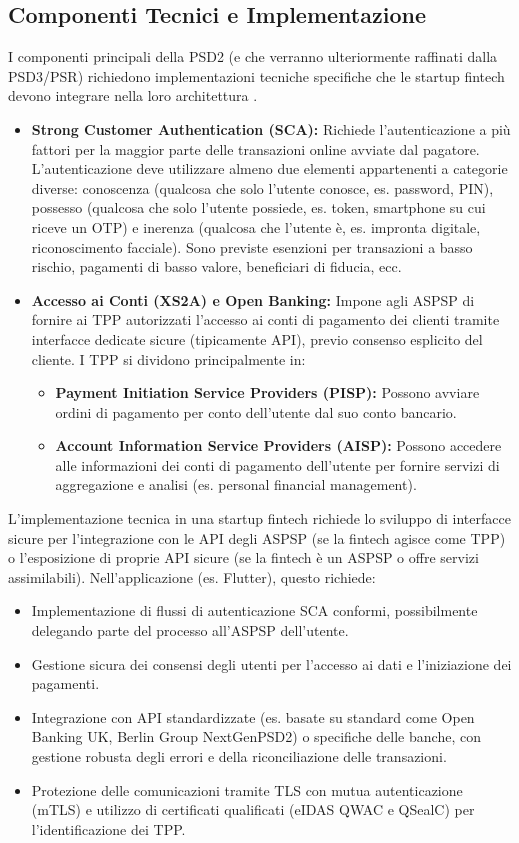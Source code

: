 \subsection{Componenti Tecnici e Implementazione}
I componenti principali della PSD2 (e che verranno ulteriormente raffinati dalla PSD3/PSR) richiedono implementazioni tecniche specifiche che le startup fintech devono integrare nella loro architettura .
\begin{itemize}
    \item \textbf{Strong Customer Authentication (SCA):} Richiede l'autenticazione a più fattori per la maggior parte delle transazioni online avviate dal pagatore. L'autenticazione deve utilizzare almeno due elementi appartenenti a categorie diverse: conoscenza (qualcosa che solo l'utente conosce, es. password, PIN), possesso (qualcosa che solo l'utente possiede, es. token, smartphone su cui riceve un OTP) e inerenza (qualcosa che l'utente è, es. impronta digitale, riconoscimento facciale). Sono previste esenzioni per transazioni a basso rischio, pagamenti di basso valore, beneficiari di fiducia, ecc.
    \item \textbf{Accesso ai Conti (XS2A) e Open Banking:} Impone agli ASPSP di fornire ai TPP autorizzati l'accesso ai conti di pagamento dei clienti tramite interfacce dedicate sicure (tipicamente API), previo consenso esplicito del cliente. I TPP si dividono principalmente in:
    \begin{itemize}
        \item \textbf{Payment Initiation Service Providers (PISP):} Possono avviare ordini di pagamento per conto dell'utente dal suo conto bancario.
        \item \textbf{Account Information Service Providers (AISP):} Possono accedere alle informazioni dei conti di pagamento dell'utente per fornire servizi di aggregazione e analisi (es. personal financial management).
    \end{itemize}
\end{itemize}
L'implementazione tecnica in una startup fintech richiede lo sviluppo di interfacce sicure per l'integrazione con le API degli ASPSP (se la fintech agisce come TPP) o l'esposizione di proprie API sicure (se la fintech è un ASPSP o offre servizi assimilabili). Nell'applicazione (es. Flutter), questo richiede:
\begin{itemize}
    \item Implementazione di flussi di autenticazione SCA conformi, possibilmente delegando parte del processo all'ASPSP dell'utente.
    \item Gestione sicura dei consensi degli utenti per l'accesso ai dati e l'iniziazione dei pagamenti.
    \item Integrazione con API standardizzate (es. basate su standard come Open Banking UK, Berlin Group NextGenPSD2) o specifiche delle banche, con gestione robusta degli errori e della riconciliazione delle transazioni.
    \item Protezione delle comunicazioni tramite TLS con mutua autenticazione (mTLS) e utilizzo di certificati qualificati (eIDAS QWAC e QSealC) per l'identificazione dei TPP.
\end{itemize}
